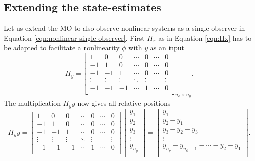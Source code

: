 \subsection{Extending the state-estimates}
Let us extend the MO to also observe nonlinear systems as a single observer in Equation \eqref{eqn:nonlinear-single-observer}. First $H_x$ as in Equation \eqref{eqn:Hx} has to be adapted to facilitate a nonlinearity $\phi$ with $y$ as an input
\begin{equation}\label{eqn:Hy}
    H_y = 
    \begin{bmatrix}
        1 & 0 & 0 & \cdots & 0 & \cdots & 0 \\
        -1 & 1 & 0 & \cdots & 0 & \cdots & 0 \\
        -1 & -1 & 1 & \cdots & 0 & \cdots & 0 \\
        \vdots & \vdots & \vdots & \ddots & \vdots &  & \vdots \\
        -1 & -1 & -1 & \cdots & 1 & \cdots & 0 \\
    \end{bmatrix}_{n_\phi \times n_y}.
\end{equation}
The multiplication $H_yy$ now gives all relative positions
\begin{equation*}
    H_yy =
    \begin{bmatrix}
        1 & 0 & 0 & \cdots & 0 & \cdots & 0 \\
        -1 & 1 & 0 & \cdots & 0 & \cdots & 0 \\
        -1 & -1 & 1 & \cdots & 0 & \cdots & 0 \\
        \vdots & \vdots & \vdots & \ddots & \vdots &  & \vdots \\
        -1 & -1 & -1 & \cdots & 1 & \cdots & 0 \\
    \end{bmatrix}
    \begin{bmatrix}
        y_1 \\ y_2 \\ y_3 \\ \vdots \\ y_{n_y} \\
    \end{bmatrix}
    =
    \begin{bmatrix}
        y_1 \\
        y_2 - y_1 \\
        y_3 - y_2 - y_3 \\
        \vdots \\
        y_{n_\phi} - y_{n_\phi-1} - \cdots - y_2 - y_1 \\
    \end{bmatrix}.
\end{equation*}
